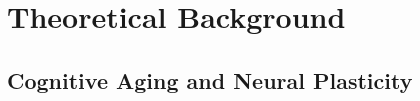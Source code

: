 \chapter{Theoretical Background}
\label{cap:Background}




\section{Cognitive Aging and Neural Plasticity}


